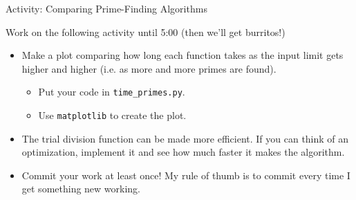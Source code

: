 \begin{frame}{Activity: Comparing Prime-Finding Algorithms}

 Work on the following activity until 5:00 (then we'll get burritos!)

 \begin{itemize}

  \item Make a plot comparing how long each function takes as the input limit 
   gets higher and higher (i.e. as more and more primes are found).

  \begin{itemize}

   \item Put your code in \texttt{time\_primes.py}.

   \item Use \texttt{matplotlib} to create the plot.

  \end{itemize}

  \item The trial division function can be made more efficient.  If you can 
   think of an optimization, implement it and see how much faster it makes the 
   algorithm.

  \item Commit your work at least once!  My rule of thumb is to commit every 
   time I get something new working.

 \end{itemize}

\end{frame}

